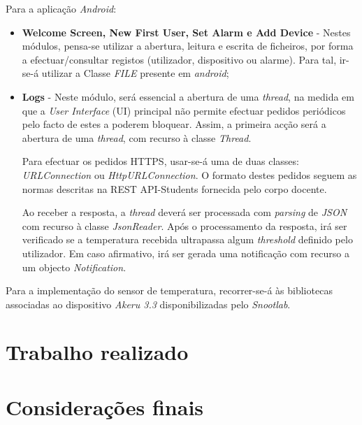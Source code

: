 \documentclass[a4paper]{article}
\begin{document}
Para a aplicação \textit{Android}:
\begin{itemize}
\item \textbf{Welcome Screen, New First User, Set Alarm e Add Device} - Nestes módulos, pensa-se utilizar a abertura, leitura e escrita de ficheiros, por forma a efectuar/consultar registos (utilizador, dispositivo ou alarme). Para tal, ir-se-á utilizar a Classe \textit{FILE} presente em \textit{android};

\item \textbf{Logs} - Neste módulo, será essencial a abertura de uma \textit{thread}, na medida em que a \textit{User Interface} (UI) principal não permite efectuar pedidos periódicos pelo facto de estes a poderem bloquear. Assim, a primeira acção será a abertura de uma \textit{thread}, com recurso à classe \textit{Thread}. 

Para efectuar os pedidos HTTPS, usar-se-á uma de duas classes: \textit{URLConnection} ou \textit{HttpURLConnection}. O formato destes pedidos seguem as normas descritas na REST API-Students fornecida pelo corpo docente.

Ao receber a resposta, a \textit{thread} deverá ser processada com \textit{parsing} de \textit{JSON} com recurso à classe \textit{JsonReader}. Após o processamento da resposta, irá ser verificado se a temperatura recebida ultrapassa algum \textit{threshold} definido pelo utilizador. Em caso afirmativo, irá ser gerada uma notificação com recurso a um objecto \textit{Notification}.
\end{itemize}

Para a implementação do sensor de temperatura, recorrer-se-á às bibliotecas associadas ao dispositivo \textit{Akeru 3.3} disponibilizadas pelo \textit{Snootlab}.

\section{Trabalho realizado}
\section{Considerações finais}
\end{document}
